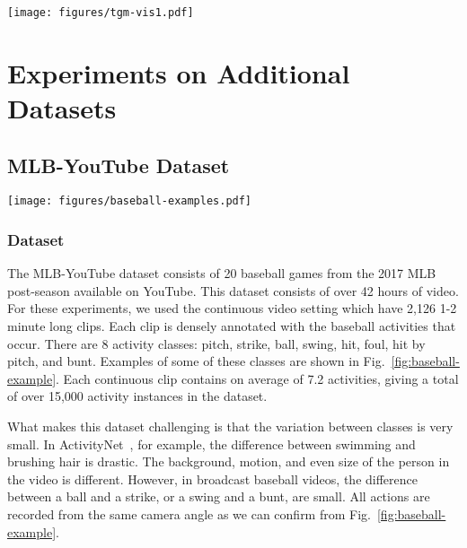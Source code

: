 \documentclass{article}
\begin{document}
\begin{figure*}
    \centering
    \texttt{[image: figures/tgm-vis1.pdf]}
    \caption{Illustration of several learned TGM kernels. On MultiTHUMOS, it learns to focus on shorter intervals to capture shorter events. On Charades, the Gaussians have a larger  value, resulting in filters that attend to longer temporal durations.}
    \label{afig:tgm-vis}
\end{figure*}


\section{Experiments on Additional Datasets}
\subsection{MLB-YouTube Dataset}
\begin{figure*}
    \centering
    \texttt{[image: figures/baseball-examples.pdf]}
    \caption{Examples of several of the activities in the MLB-YouTube dataset: (a) Pitch, (b) Hit, (c) Bunt,  (d) Hit by pitch, (e) No activity. This shows the difficulty of this dataset, as the difference between hit and bunt, swing and no swing are very small.}
    \label{fig:baseball-example}
\end{figure*}

\subsubsection{Dataset}
The MLB-YouTube dataset \citep{mlbyoutube2018} consists of 20 baseball games from the 2017 MLB post-season available on YouTube. This dataset consists of over 42 hours of video. For these experiments, we used the continuous video setting which have 2,126 1-2 minute long clips. Each clip is densely annotated with the baseball activities that occur. There are 8 activity classes: pitch, strike, ball, swing, hit, foul, hit by pitch, and bunt. Examples of some of these classes are shown in Fig.~\ref{fig:baseball-example}. Each continuous clip contains on average of 7.2 activities, giving a total of over 15,000 activity instances in the dataset.

What makes this dataset challenging is that the variation between classes is very small. In ActivityNet~\citep{caba2015activitynet}, for example, the difference between swimming and brushing hair is drastic. The background, motion, and even size of the person in the video is different. However, in broadcast baseball videos, the difference between a ball and a strike, or a swing and a bunt, are small. All actions are recorded from the same camera angle as we can confirm from Fig.~\ref{fig:baseball-example}.
\end{document}
